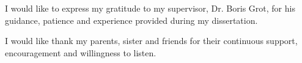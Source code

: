 I would like to express my gratitude to my supervisor, Dr. Boris Grot, for his guidance, patience and experience provided during my dissertation.

I would like thank my parents, sister and friends for their continuous support, encouragement and willingness to listen.